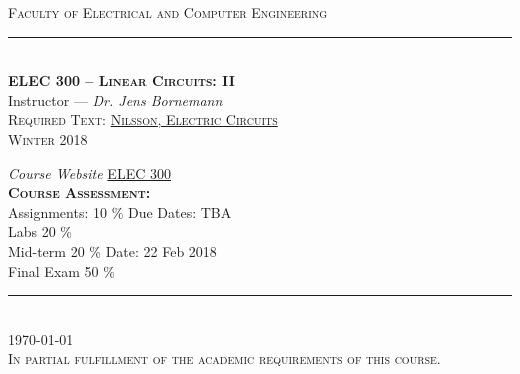 \documentclass{report}
\theoremstyle{plain}
\theoremstyle{definition}
\theoremstyle{remark}
\begin{document}
\begin{titlepage}
	\begin{center}
		{\Huge \textsc{Faculty of Electrical and Computer Engineering} \\ \vspace{4pt}}
		\rule[13pt]{1\textwidth}{1pt} \\ \vspace{1pt}
		{\LARGE \textbf{{\textsc{ELEC 300 – Linear Circuits: II }}} \\ Instructor  --- \textit{Dr. Jens Bornemann} \\ }
		{\Large \textsc{Required Text: \hyperlink{ref-book:nilEC}{Nilsson, Electric Circuits}} \\} 
		\vspace{4pt} 
		{\Large \textsc{Winter 2018}} \\ 
		\vspace{20pt}
		\begin{minipage}{0.96\linewidth}
			\begin{flushright}
					{
					\large \textit{Course Website} \href{http://www.ece.uvic.ca/~jbornema/300-LinCircII-S2018.html}{ELEC 300}  \\
					\textsc{\textbf{Course Assessment:}} \\
					Assignments: 10 \% Due Dates: TBA \\
					Labs 20 \% \\
					Mid-term 20 \% Date: 22 Feb 2018 \\
					Final Exam 50 \%} \\
			\end{flushright}
		\end{minipage}
		\begin{minipage}{0.02\linewidth}
			\rule[0pt]{1pt}{110pt} 
		\end{minipage}
		\\ \vspace{40pt}
		{\Large \textsc{\today} \\ \vspace{15pt}
			{\Large \textsc{In partial fulfillment of the academic requirements of this course. \\
				}
			}	
		}
		
	\end{center}
\end{titlepage}
\tableofcontents
\listoffigures
\listoftables
\lstlistoflistings
\end{document}
